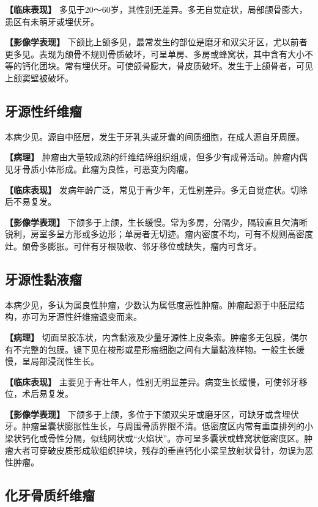 \textbf{【临床表现】}
多见于20～60岁，其性别无差异。多无自觉症状，局部颌骨膨大，患区有未萌牙或埋伏牙。

\textbf{【影像学表现】}
下颌比上颌多见，最常发生的部位是磨牙和双尖牙区，尤以前者更多见。表现为颌骨不规则骨质破坏，可呈单房、多房或蜂窝状，其中含有大小不等的钙化团块。常有埋伏牙。可使颌骨膨大，骨皮质破坏。发生于上颌骨者，可见上颌窦壁被破坏。

\subsection{牙源性纤维瘤}

本病少见。源自中胚层，发生于牙乳头或牙囊的间质细胞，在成人源自牙周膜。

\textbf{【病理】}
肿瘤由大量较成熟的纤维结缔组织组成，但多少有成骨活动。肿瘤内偶见牙骨质小体形成。此瘤为良性，可恶变为肉瘤。

\textbf{【临床表现】}
发病年龄广泛，常见于青少年，无性别差异。多无自觉症状。切除后不易复发。

\textbf{【影像学表现】}
下颌多于上颌，生长缓慢。常为多房，分隔少，隔较直且欠清晰锐利，房室多呈方形或多边形；单房者无切迹。瘤内密度不均，可有不规则高密度灶。颌骨多膨胀。可伴有牙根吸收、邻牙移位或缺失，瘤内可含牙。

\subsection{牙源性黏液瘤}

本病少见，多认为属良性肿瘤，少数认为属低度恶性肿瘤。肿瘤起源于中胚层结构，亦可为牙源性纤维瘤退变而来。

\textbf{【病理】}
切面呈胶冻状，内含黏液及少量牙源性上皮条索。肿瘤多无包膜，偶尔有不完整的包膜。镜下见在梭形或星形瘤细胞之间有大量黏液样物。一般生长缓慢，呈局部浸润性生长。

\textbf{【临床表现】}
主要见于青壮年人，性别无明显差异。病变生长缓慢，可使邻牙移位，术后易复发。

\textbf{【影像学表现】}
下颌多于上颌，多位于下颌双尖牙或磨牙区，可缺牙或含埋伏牙。肿瘤呈囊状膨胀性生长，与周围骨质界限不清。低密度区内常有垂直排列的小梁状钙化或骨性分隔，似线网状或“火焰状”。亦可呈多囊状或蜂窝状低密度区。肿瘤大者可穿破皮质形成软组织肿块，残存的垂直钙化小梁呈放射状骨针，勿误为恶性肿瘤。

\subsection{化牙骨质纤维瘤}

